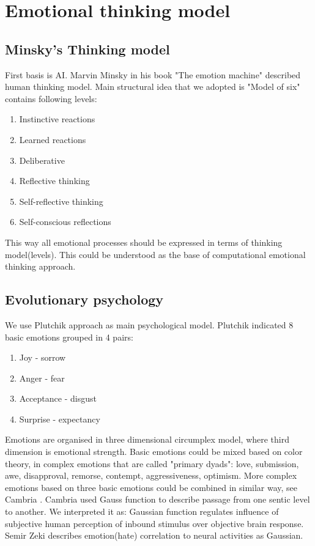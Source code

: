\section{Emotional thinking model}

\subsection{Minsky's Thinking model}

First basis is  AI. Marvin Minsky in his book "The emotion machine"\cite{emotionmachine} described human thinking model. Main structural idea that we adopted is "Model of six" contains following levels: 
\begin{enumerate}
\item  Instinctive reactions
\item  Learned reactions
\item  Deliberative
\item  Reflective thinking
\item  Self-reflective thinking
\item  Self-conscious reflections
\end{enumerate}

This way all emotional processes should be expressed in terms of thinking model(levels). This could be understood as the base of computational emotional thinking approach.

\subsection{Evolutionary psychology}

We use Plutchik approach\cite{natureofemotions} as main psychological model. Plutchik indicated 8 basic emotions grouped in 4 pairs:

\begin{enumerate}
\item  Joy - sorrow
\item  Anger - fear
\item  Acceptance - disgust
\item  Surprise - expectancy
\end{enumerate}

Emotions are organised in three dimensional circumplex model, where third dimension is emotional strength. Basic emotions could be mixed based on color theory, in complex emotions that are called "primary dyads": love, submission, awe, disapproval, remorse, contempt, aggressiveness, optimism. More complex emotions based on three basic emotions could be combined in similar way, see Cambria \cite{senticcomputing}. Cambria \cite{hourglass} used Gauss function to describe passage from one sentic level to another. We interpreted it as: Gaussian function regulates influence of subjective human perception of inbound stimulus over objective brain response. Semir Zeki\cite{neuralcorrelatesofhate} describes emotion(hate) correlation to neural activities as Gaussian.

